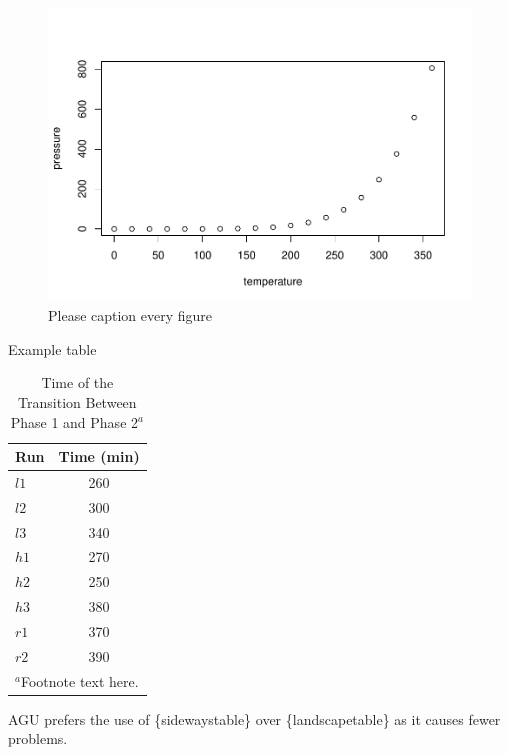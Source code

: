 \documentclass[draft,linenumbers]{agujournal2018}
\begin{document}
\begin{figure}[h]
\includegraphics{StreamFluxArticle_files/figure-latex/unnamed-chunk-2-1} \caption{Please caption every figure}\label{fig:unnamed-chunk-2}
\end{figure}

Example table

\begin{table}
 \caption{Time of the Transition Between Phase 1 and Phase 2$^{a}$}
 \centering
 \begin{tabular}{l c}
 \hline
  Run  & Time (min)  \\
 \hline
   $l1$  & 260   \\
   $l2$  & 300   \\
   $l3$  & 340   \\
   $h1$  & 270   \\
   $h2$  & 250   \\
   $h3$  & 380   \\
   $r1$  & 370   \\
   $r2$  & 390   \\
 \hline
 \multicolumn{2}{l}{$^{a}$Footnote text here.}
 \end{tabular}
 \end{table}

AGU prefers the use of \{sidewaystable\} over \{landscapetable\} as it
causes fewer problems.
\end{document}
